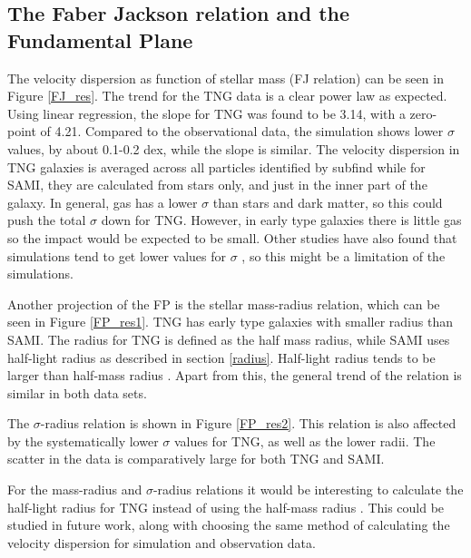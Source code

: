\subsection{The Faber Jackson relation and the Fundamental Plane}

The velocity dispersion as function of stellar mass (FJ relation) can be seen in Figure \ref{FJ_res}. The trend for the TNG data is a clear power law as expected. Using linear regression, the slope for TNG was found to be 3.14, with a zero-point of 4.21. Compared to the observational data, the simulation shows lower $\sigma$ values, by about 0.1-0.2 dex, while the slope is similar. The velocity dispersion in TNG galaxies is averaged across all particles identified by subfind while for SAMI, they are calculated from stars only, and just in the inner part of the galaxy. In general, gas has a lower $\sigma$ than stars and dark matter, so this could push the total $\sigma$ down for TNG. However, in early type galaxies there is little gas so the impact would be expected to be small. Other studies have also found that simulations tend to get lower values for $\sigma$ \parencite{Sande2018}, so this might be a limitation of the simulations.

Another projection of the FP is the stellar mass-radius relation, which can be seen in Figure \ref{FP_res1}. TNG has early type galaxies with smaller radius than SAMI. The radius for TNG is defined as the half mass radius, while SAMI uses half-light radius as described in section \ref{radius}. Half-light radius tends to be larger than half-mass radius \parencite{Sande2018}. Apart from this, the general trend of the relation is similar in both data sets.

The $\sigma$-radius relation is shown in Figure \ref{FP_res2}. This relation is also affected by the systematically lower $\sigma$ values for TNG, as well as the lower radii. The scatter in the data is comparatively large for both TNG and SAMI.

For the mass-radius and $\sigma$-radius relations it would be interesting to calculate the half-light radius for TNG instead of using the half-mass radius \parencite[this has been done for instance by][]{Genel2017}. This could be studied in future work, along with choosing the same method of calculating the velocity dispersion for simulation and observation data.

